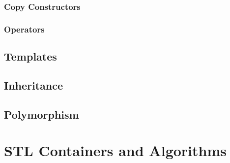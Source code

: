\documentclass[11pt,fancy,authoryear]{elegantbook}
\begin{document}
\subsection{Copy Constructors}

\subsection{Operators}

\section{Templates}

\section{Inheritance}

\section{Polymorphism}

\chapter{STL Containers and Algorithms}
\end{document}
